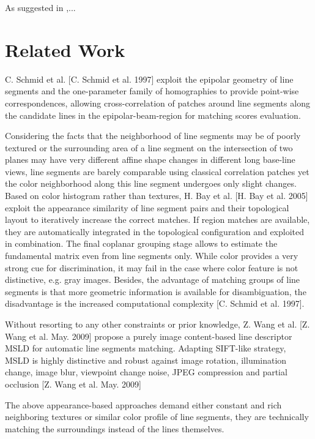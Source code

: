 As \citeauthor{HoferFeb2013} suggested in \citeyear{HoferFeb2013},...


\section{Related Work}

C. Schmid et al. [C. Schmid et al. 1997] exploit the epipolar geometry of line segments and the one-parameter family of homographies to provide point-wise correspondences, allowing cross-correlation of patches around line segments along the candidate lines in the epipolar-beam-region for matching scores evaluation.

Considering the facts that the neighborhood of line segments may be of poorly textured or the surrounding area of a line segment on the intersection of two planes may have very different affine shape changes in different long base-line views, line segments are barely comparable using classical correlation patches yet the color neighborhood along this line segment undergoes only slight changes. %
Based on color histogram rather than textures, H. Bay et al. [H. Bay et al. 2005] exploit the appearance similarity of line segment pairs and their topological layout to iteratively increase the correct matches. If region matches are available, they are automatically integrated in the topological configuration and exploited in combination. The final coplanar grouping stage allows to estimate the fundamental matrix even from line segments only. While color provides a very strong cue for discrimination, it may fail in the case where color feature is not distinctive, e.g. gray images. Besides, the advantage of matching groups of line segments is that more geometric information is available for disambiguation, the disadvantage is the increased computational complexity [C. Schmid et al. 1997].


Without resorting to any other constraints or prior knowledge, Z. Wang et al. [Z. Wang et al. May. 2009] propose a purely image content-based line descriptor MSLD for automatic line segments matching. Adapting SIFT-like strategy, MSLD is highly distinctive and robust against image rotation, illumination change, image blur, viewpoint change noise, JPEG compression and partial occlusion [Z. Wang et al. May. 2009]

The above appearance-based approaches demand either constant and rich neighboring textures or similar color profile of line segments, they are technically matching the surroundings instead of the lines themselves.

